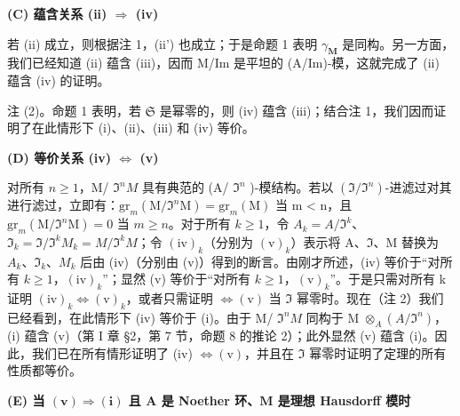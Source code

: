 \textbf{(C) 蕴含关系 (ii) \(\Rightarrow\) (iv)}\par

若 (ii) 成立，则根据注 1，(ii') 也成立；于是命题 1 表明 \(\gamma_{\mathbf{M}}\) 是同构。另一方面，我们已经知道 (ii) 蕴含 (iii)，因而 M/Im 是平坦的 (A/Im)-模，这就完成了 (ii) 蕴含 (iv) 的证明。

注 (2)。命题 1 表明，若 \(\mathfrak{S}\) 是幂零的，则 (iv) 蕴含 (iii)；结合注 1，我们因而证明了在此情形下 (i)、(ii)、(iii) 和 (iv) 等价。

\textbf{(D) 等价关系 (iv) \(\Leftrightarrow\) (v)}\par

  对所有 \(n \geqslant 1\)，M/ \(\Im^{n}M\) 具有典范的 (A/ \(\Im^{n}\) )-模结构。若以 \((\Im/\Im^{n})\)-进滤过对其进行滤过，立即有：\(\mathrm{gr}_{m}(\mathrm{M}/\Im^{n}\mathrm{M}) = \mathrm{gr}_{m}(\mathrm{M})\) 当 m \textless{} n，且 \(\mathrm{gr}_{m}(\mathrm{M}/\Im^{n}\mathrm{M}) = 0\) 当 \(m \geqslant n\)。对于所有 \(k \geqslant 1\)，令 \(A_{k} = A/\Im^{k}\)、\(\Im_{k} = \Im/\Im^{k} M_{k} = M/\Im^{k} M\)；令 \((\mathrm{iv})_{k}\)（分别为 \((\mathrm{v})_{k}\)）表示将 A、\(\Im\)、M 替换为 \(A_{k}\)、\(\Im_{k}\)、\(M_{k}\) 后由 (iv)（分别由 (v)）得到的断言。由刚才所述，(iv) 等价于“对所有 \(k \geqslant 1\)，\((\mathrm{iv})_{k}\)”；显然 (v) 等价于“对所有 \(k \geqslant 1\)，\((\mathrm{v})_{k}\)”。于是只需对所有 k 证明 \((\mathrm{iv})_{k} \Leftrightarrow (\mathrm{v})_{k}\)，或者只需证明 \(\Leftrightarrow (\mathrm{v})\) 当 \(\Im\) 幂零时。现在（注 2）我们已经看到，在此情形下 (iv) 等价于 (i)。由于 M/ \(\Im^{n}M\) 同构于 M \(\otimes_{A} (A/\Im^{n})\)，(i) 蕴含 (v)（第 I 章 §2，第 7 节，命题 8 的推论 2）；此外显然 (v) 蕴含 (i)。因此，我们已在所有情形证明了 (iv) \(\Leftrightarrow (\mathrm{v})\)，并且在 \(\Im\) 幂零时证明了定理的所有性质都等价。

\textbf{(E) 当 \((\mathbf{v})\Rightarrow (\mathbf{i})\) 且 \(\mathbf{A}\) 是 Noether 环、\(\mathbf{M}\) 是理想 Hausdorff 模时}\par

